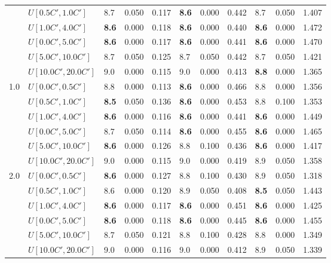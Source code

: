 \begin{table}[h]
{\begin{tabular}{|l|l||l|l|l||l|l|l||l|l|l|}
       & $U[0.5C',1.0C']$ & 8.7 & 0.050 & 0.117 & \textbf{8.6} & 0.000 & 0.442 & 8.7 & 0.050 & 1.407 \\
       & $U[1.0C',4.0C']$ & \textbf{8.6} & 0.000 & 0.118 & \textbf{8.6} & 0.000 & 0.440 & \textbf{8.6} & 0.000 & 1.472 \\
       & $U[0.0C',5.0C']$ & \textbf{8.6} & 0.000 & 0.117 & \textbf{8.6} & 0.000 & 0.441 & \textbf{8.6} & 0.000 & 1.470 \\
       & $U[5.0C',10.0C']$ & 8.7 & 0.050 & 0.125 & 8.7 & 0.050 & 0.442 & 8.7 & 0.050 & 1.421 \\
       & $U[10.0C',20.0C']$ & 9.0 & 0.000 & 0.115 & 9.0 & 0.000 & 0.413 & \textbf{8.8} & 0.000 & 1.365 \\
      \hline\hline
      \multirow{6}{*}{1.0} & $U[0.0C',0.5C']$ & 8.8 & 0.000 & 0.113 & \textbf{8.6} & 0.000 & 0.466 & 8.8 & 0.000 & 1.356 \\
       & $U[0.5C',1.0C']$ & \textbf{8.5} & 0.050 & 0.136 & \textbf{8.6} & 0.000 & 0.453 & 8.8 & 0.100 & 1.353 \\
       & $U[1.0C',4.0C']$ & \textbf{8.6} & 0.000 & 0.116 & \textbf{8.6} & 0.000 & 0.441 & \textbf{8.6} & 0.000 & 1.449 \\
       & $U[0.0C',5.0C']$ & 8.7 & 0.050 & 0.114 & \textbf{8.6} & 0.000 & 0.455 & \textbf{8.6} & 0.000 & 1.465 \\
       & $U[5.0C',10.0C']$ & \textbf{8.6} & 0.000 & 0.126 & 8.8 & 0.100 & 0.436 & \textbf{8.6} & 0.000 & 1.417 \\
       & $U[10.0C',20.0C']$ & 9.0 & 0.000 & 0.115 & 9.0 & 0.000 & 0.419 & 8.9 & 0.050 & 1.358 \\
      \hline\hline
      \multirow{6}{*}{2.0} & $U[0.0C',0.5C']$ & \textbf{8.6} & 0.000 & 0.127 & 8.8 & 0.100 & 0.430 & 8.9 & 0.050 & 1.318 \\
       & $U[0.5C',1.0C']$ & 8.6 & 0.000 & 0.120 & 8.9 & 0.050 & 0.408 & \textbf{8.5} & 0.050 & 1.443 \\
       & $U[1.0C',4.0C']$ & \textbf{8.6} & 0.000 & 0.117 & \textbf{8.6} & 0.000 & 0.451 & \textbf{8.6} & 0.000 & 1.425 \\
       & $U[0.0C',5.0C']$ & \textbf{8.6} & 0.000 & 0.118 & \textbf{8.6} & 0.000 & 0.445 & \textbf{8.6} & 0.000 & 1.455 \\
       & $U[5.0C',10.0C']$ & 8.7 & 0.050 & 0.121 & 8.8 & 0.100 & 0.428 & 8.8 & 0.000 & 1.349 \\
       & $U[10.0C',20.0C']$ & 9.0 & 0.000 & 0.116 & 9.0 & 0.000 & 0.412 & 8.9 & 0.050 & 1.339 \\

\end{tabular}}
\end{table}
